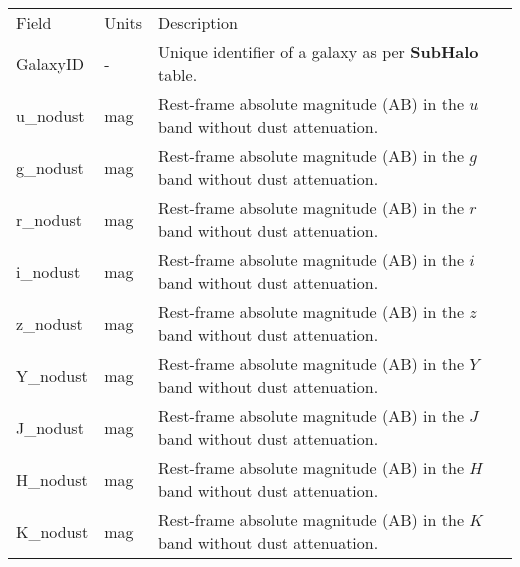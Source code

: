 \begin{table*}
\caption{Full listing of the content of the magnitudes table and description of
  the columns. These properties are contained in tables denoted {\bf
    [modelname]\_Magnitudes}. This table contains absolute rest-frame magnitudes without dust
    attenuation for all galaxies with $M_*>10^{8.5}\Msol$ contained in the {\bf
    SubHalo} table. This table can be joined to the {\bf SubHalo} table using
    the \GalaxyID field. The magnitudes in the different
    SDSS \citep{SDSSfilters} and UKIRT \citep{UKIRTfilters} filters have been
    computed in 30~pkpc spherical apertures following the procedure described
    by \citet{Trayford2015}.}
\label{table:magnitudes}
\begin{center}
\footnotesize
\renewcommand{\arraystretch}{1.5}
\begin{tabular}{ >{\ttfamily}p{4cm}p{1.5cm}p{11cm}}
{\large \bf Magnitudes} & & \\
\hline
\normalfont Field & Units & Description \\
\hline\hline

GalaxyID &
- &
Unique identifier of a galaxy as per {\bf SubHalo} table.\\

\hline
u\_nodust & mag & Rest-frame absolute magnitude (AB) in the $u$ band without dust
attenuation. \\
g\_nodust & mag & Rest-frame absolute magnitude (AB) in the $g$ band without dust
attenuation. \\
r\_nodust & mag & Rest-frame absolute magnitude (AB) in the $r$ band without dust
attenuation. \\
i\_nodust & mag & Rest-frame absolute magnitude (AB) in the $i$ band without dust
attenuation. \\ 
z\_nodust & mag & Rest-frame absolute magnitude (AB) in the $z$ band without dust
attenuation. \\ 
Y\_nodust & mag & Rest-frame absolute magnitude (AB) in the $Y$ band without dust
attenuation. \\ 
J\_nodust & mag & Rest-frame absolute magnitude (AB) in the $J$ band without dust
attenuation. \\ 
H\_nodust & mag & Rest-frame absolute magnitude (AB) in the $H$ band without dust
attenuation. \\ 
K\_nodust & mag & Rest-frame absolute magnitude (AB) in the $K$ band without dust
attenuation. \\ 
\hline

\end{tabular}
\end{center}
\end{table*}


\twocolumn
